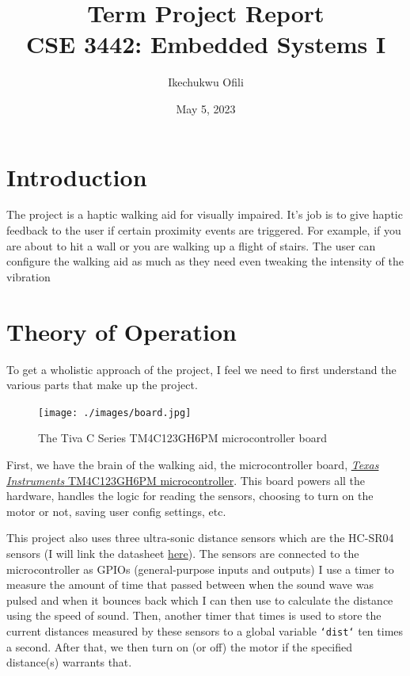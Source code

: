 \documentclass[11pt]{article}
\author{Ikechukwu Ofili}
\date{May 5, 2023}
\title{Term Project Report\\\medskip
\large CSE 3442: Embedded Systems I}
\begin{document}
\maketitle
\clearpage \tableofcontents \clearpage

\section{Introduction}
\label{sec:org23da146}
  The project is a haptic walking aid for visually impaired. It's job is to give haptic feedback to the user if certain proximity events are triggered. 
For example, if you are about to hit a wall or you are walking up a flight of stairs. The user can configure the walking aid as much as they need even tweaking the intensity of the vibration


\section{Theory of Operation}
\label{sec:org0325ce6}
To get a wholistic approach of the project, I feel we need to first understand the various parts that make up the project.

\begin{figure}[H]
\centering
\texttt{[image: ./images/board.jpg]}
\caption{The Tiva C Series TM4C123GH6PM microcontroller board}
\end{figure}

First, we have the brain of the walking aid, the microcontroller board, \href{https://www.ti.com/product/TM4C123GH6PM}{ \emph{Texas Instruments} TM4C123GH6PM microcontroller}.
This board powers all the hardware, handles the logic for reading the sensors, choosing to turn on the motor or not, saving user config settings, etc.

This project also uses three ultra-sonic distance sensors which are the HC-SR04 sensors (I will link the datasheet \href{https://www.handsontec.com/dataspecs/HC-SR04-Ultrasonic.pdf}{here}). The sensors are connected to the
microcontroller as GPIOs (general-purpose inputs and outputs) 
I use a timer to measure the amount of time that passed between when the sound wave was pulsed and when it bounces back which I can then use to calculate
the distance using the speed of sound. Then, another timer that times is used to store the current distances measured by these sensors to a global variable \texttt{`dist`}
ten times a second. After that, we then turn on (or off) the motor if the specified distance(s) warrants that. 
\end{document}
